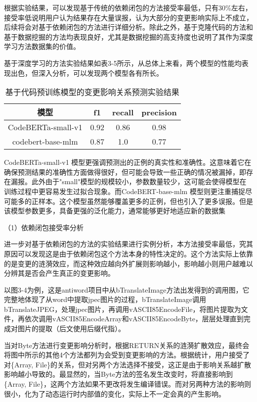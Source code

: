 根据实验结果，可以发现基于传统的依赖闭包的方法接受率最低，只有30\%左右，接受率低说明用户认为结果存在大量误报，认为大部分的变更影响实际上不成立，后续将会对基于依赖闭包的方法进行详细分析。除此之外，基于克隆代码的方法和基于数据挖掘的方法均表现良好，尤其是数据挖掘的高支持度也说明了其作为深度学习方法数据集的价值。


基于深度学习的方法实验结果如表3-5所示，从总体上来看，两个模型的性能均表现出色，但深入分析，可以发现两个模型各有所长。

\begin{table}[htbp]
\caption{基于代码预训练模型的变更影响关系预测实验结果}
\vspace{0.5em}\centering\wuhao
\begin{tabular}{cccc}
\toprule
模型& f1 & recall & precision \\
\midrule
CodeBERTa-small-v1 & 0.92 & 0.86 & 0.98 \\
codebert-base-mlm  & 0.87 & 1.0  & 0.77 \\
\bottomrule
\end{tabular}
\end{table}

CodeBERTa-small-v1 模型更强调预测出的正例的真实性和准确性。这意味着它在确保预测结果的准确性方面做得很好，但可能会导致一些正确的情况被漏掉，即存在漏报。此外由于"small"模型的规模较小，参数数量较少，这可能会使得模型在训练过程中更容易发生过拟合现象。而CodeBERT-base-mlm 模型则更注重捕捉尽可能多的正样本。这个模型虽然能够覆盖更多的正例，但也引入了更多误报。但是该模型参数更多，具备更强的泛化能力，通常能够更好地适应新的数据集

（1）依赖闭包接受率分析

进一步对基于依赖闭包的方法的实验结果进行实例分析，本方法接受率最低，究其原因可以发现这是由于依赖闭包这个方法本身的特性决定的。这个方法实际上依靠的是变更的涟漪效应，而这种效应越向外扩展则影响越小，影响越小则用户越难以分辨其是否会产生真正的变更影响。

以图3-4为例，这是antiword项目中从bTranslateImage方法出发得到的调用图，它完整地体现了从word中提取jpec图片的过程，bTranslateImage调用bTranslateJPEG，处理jpec图片，再调用vASCII85EncodeFile，将图片提取为文件，再依次调用vASCII85EncodeArray和vASCII85EncodeByte，层层处理直到完成对图片的提取（后文使用后缀代指）。

当对Byte方法进行变更影响分析时，根据RETURN关系的涟漪扩散效应，最终会将图中所示的其他4个方法都列为会受到变更影响的方法。根据统计，用户接受了对\{Array, File\}的关系，但对另两个方法选择不接受，这正是由于影响关系越扩散影响越小导致的。最显然的，当Byte方法的签名发生改变时，将直接影响到\{Array, File\}，这两个方法如果不更改将发生编译错误。而对另两种方法的影响则很小，化为了动态运行时内部值的变化，实际上不一定会真的产生影响。

